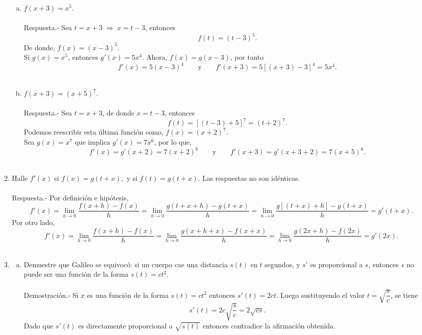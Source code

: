 \begin{enumerate}[\bfseries 1]
\begin{enumerate}[(a)]
	    \item $f(x+3)=x^5$.\\\\
		Respuesta.-\; Sea $t=x+3\; \Rightarrow \; x=t-3$, entonces
		$$f(t)=(t-3)^5.$$
		De donde, $f(x)=(x-3)^5$.\\

		Si $g(x)=x^5$, entonces $g'(x)=5x^4$. Ahora,  $f(x)=g(x-3)$, por tanto  
		$$f'(x) = 5(x-3)^4 \qquad \mbox{y}\qquad f'(x+3) = 5[(x+3)-3]^4 = 5x^4.$$\\

	    \item $f(x+3)=(x+5)^7$.\\\\
		Respuesta.-\; Sea $t=x+3$, de donde $x=t-3$, entonces
		$$f(t) = \left[(t-3)+5\right]^7 = (t+2)^7.$$
		Podemos reescribir esta última función como, $f(x)=(x+2)^7$.\\

		Sea $g(x)=x^7$ que implica $g'(x)=7x^6$, por lo que,
		$$f'(x)=g'(x+2)=7(x+2)^6\qquad \mbox{y}\qquad f'(x+3)=g'(x+3+2)=7(x+5)^6.$$\\

	\end{enumerate}

    \item Halle $f'(x)$ si $f(x)=g(t+x),$ y si $f(t)=g(t+x)$. Las respuestas no son idénticas.\\\\
	Respuesta.-\; Por definición e hipótesis,
	$$f'(x)=\lim_{h\to 0} \dfrac{f(x+h)-f(x)}{h}=\lim_{h\to 0}\dfrac{g(t+x+h)-g(t+x)}{h}=\lim_{h\to 0}\dfrac{g\left[(t+x)+h\right]-g(t+x)}{h}=g'(t+x).$$
	Por otro lado,
	$$f'(x)=\lim_{h\to 0}\dfrac{f(x+h)-f(x)}{h}=\lim_{h\to 0}\dfrac{g(x+h+x)-f(x+x)}{h}=\lim_{h\to 0}\dfrac{g(2x+h)-f(2x)}{h} = g'(2x).$$\\

    \item 
	\begin{enumerate}[(a)]

	    \item Demuestre que Galileo se equivocó: si un cuerpo cae una distancia $s(t)$ en $t$ segundos, y $s'$ es proporcional a $s$, entonces $s$ no puede ser una función de la forma $s(t)=ct^2.$\\\\
		Demostración.-\; Si $x$ es una función de la forma $s(t)=ct^2$ entonces $s'(t)=2ct$. Luego sustituyendo el valor $t=\sqrt{\dfrac{s}{c}}$, se tiene
		$$s'(t)=2c \sqrt{\dfrac{s}{c}}=2\sqrt{cs}.$$
		Dado que $s'(t)$ es directamente proporcional a $\sqrt{s(t)}$ entonces contradice la afirmación obtenida.\\\\ 


\end{enumerate}
\end{enumerate}

